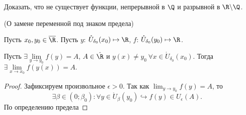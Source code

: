 \begin{problem}
    Доказать, что не существует функции, непрерывной в $\Q$ и разрывной в $\R \backslash \Q$.
\end{problem}
\begin{theorem} \hypertarget{thrm4.17}{(О замене переменной под знаком предела)}
    Пусть $x_{0}, y_{0} \in \overline{\R}$. Пусть $y$: $\mathring{U}_{\delta_{0}} (x_{0}) \mapsto \R$, $f$: $\mathring{U}_{\delta_{0}} (y_{0}) \mapsto \R$. 
    
    Пусть $\exists \lim\limits_{y\to y_{0}} f (y) = A$, $A \in \Hat{\R}$ и $y (x) \neq y_{0} \  \forall x \in \mathring{U}_{\delta_{0}} (x_{0}).$ Тогда $\exists \lim\limits_{x\to x_{0}} f (y (x)) = A.$
\end{theorem}
\begin{proof}
    Зафиксируем произвольное $\epsilon > 0$. Так как $\lim_{y \to y_{0}} f (y) = A$, то
    $$ \exists \beta \in (0; \beta_{0}): \forall y \in \ring{U}_{\beta} (y_{0}) \hookrightarrow f (y) \in U_{\epsilon} (A).$$
    По определению предела
\end{proof}